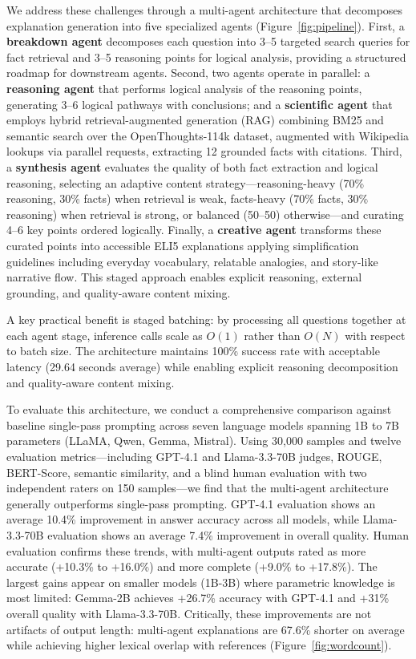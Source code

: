 We address these challenges through a multi-agent architecture that decomposes explanation generation into five specialized agents (Figure~\ref{fig:pipeline}). First, a \textbf{breakdown agent} decomposes each question into 3--5 targeted search queries for fact retrieval and 3--5 reasoning points for logical analysis, providing a structured roadmap for downstream agents. Second, two agents operate in parallel: a \textbf{reasoning agent} that performs logical analysis of the reasoning points, generating 3--6 logical pathways with conclusions; and a \textbf{scientific agent} that employs hybrid retrieval-augmented generation (RAG) combining BM25 and semantic search over the OpenThoughts-114k dataset, augmented with Wikipedia lookups via parallel requests, extracting 12 grounded facts with citations. Third, a \textbf{synthesis agent} evaluates the quality of both fact extraction and logical reasoning, selecting an adaptive content strategy---reasoning-heavy (70\% reasoning, 30\% facts) when retrieval is weak, facts-heavy (70\% facts, 30\% reasoning) when retrieval is strong, or balanced (50--50) otherwise---and curating 4--6 key points ordered logically. Finally, a \textbf{creative agent} transforms these curated points into accessible ELI5 explanations applying simplification guidelines including everyday vocabulary, relatable analogies, and story-like narrative flow. This staged approach enables explicit reasoning, external grounding, and quality-aware content mixing.

A key practical benefit is staged batching: by processing all questions together at each agent stage, inference calls scale as $O(1)$ rather than $O(N)$ with respect to batch size. The architecture maintains 100\% success rate with acceptable latency (29.64 seconds average) while enabling explicit reasoning decomposition and quality-aware content mixing.

To evaluate this architecture, we conduct a comprehensive comparison against baseline single-pass prompting across seven language models spanning 1B to 7B parameters (LLaMA, Qwen, Gemma, Mistral). Using 30,000 samples and twelve evaluation metrics---including GPT-4.1 and Llama-3.3-70B judges, ROUGE, BERT-Score, semantic similarity, and a blind human evaluation with two independent raters on 150 samples---we find that the multi-agent architecture generally outperforms single-pass prompting. GPT-4.1 evaluation shows an average 10.4\% improvement in answer accuracy across all models, while Llama-3.3-70B evaluation shows an average 7.4\% improvement in overall quality. Human evaluation confirms these trends, with multi-agent outputs rated as more accurate (+10.3\% to +16.0\%) and more complete (+9.0\% to +17.8\%). The largest gains appear on smaller models (1B-3B) where parametric knowledge is most limited: Gemma-2B achieves +26.7\% accuracy with GPT-4.1 and +31\% overall quality with Llama-3.3-70B. Critically, these improvements are not artifacts of output length: multi-agent explanations are 67.6\% shorter on average while achieving higher lexical overlap with references (Figure~\ref{fig:wordcount}).

